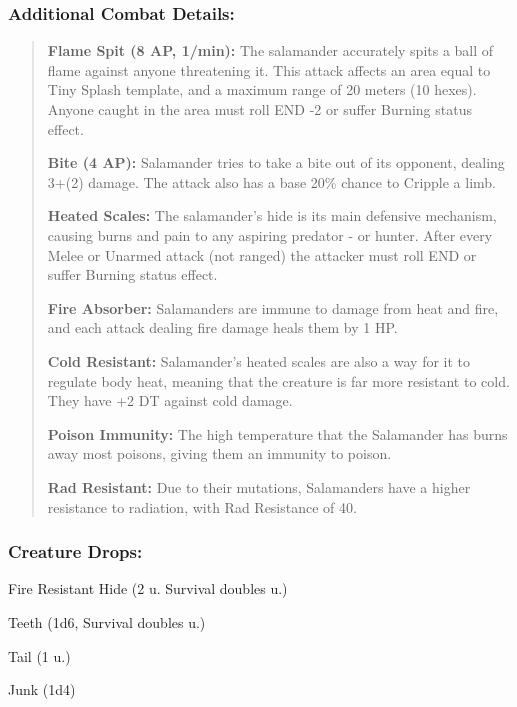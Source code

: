 \documentclass[11pt,a4paper,twocolumn]{book}
\begin{document}
	\subsubsection*{Additional Combat Details:}
	\begin{verse}
		\textbf{Flame Spit (8 AP, 1/min):} The salamander accurately spits a ball of flame against anyone threatening it. This attack affects an area equal to Tiny Splash template, and a maximum range of 20 meters (10 hexes). Anyone caught in the area must roll END -2 or suffer  Burning status effect.
		
		\textbf{Bite (4 AP):} Salamander tries to take a bite out of its opponent, dealing 3+(2) damage. The attack also has a base 20\% chance to Cripple a limb.
		
		\textbf{Heated Scales:} The salamander's hide is its main defensive mechanism, causing burns and pain to any aspiring predator - or hunter. After every Melee or Unarmed attack (not ranged) the attacker must roll END or suffer Burning status effect.
		
		\textbf{Fire Absorber:} Salamanders are immune to damage from heat and fire, and each attack dealing fire damage heals them by 1 HP.
		
		\textbf{Cold Resistant:} Salamander's heated scales are also a way for it to regulate body heat, meaning that the creature is far more resistant to cold. They have +2 DT against cold damage.
		
		\textbf{Poison Immunity:} The high temperature that the Salamander has burns away most poisons, giving them an immunity to poison.
		
		\textbf{Rad Resistant:} Due to their mutations, Salamanders have a higher resistance to radiation, with Rad Resistance of 40.
	\end{verse}
	
	
	
	\subsubsection*{Creature Drops:}
	\begin{compactitem}
		\item Fire Resistant Hide (2 u. Survival doubles u.)
		\item Teeth (1d6, Survival doubles u.)
		\item Tail (1 u.)
		\item Junk (1d4)
	\end{compactitem}
	
\end{document}
